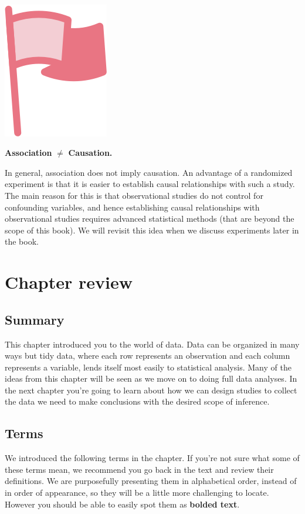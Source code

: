 \documentclass[
  10pt,
  openany]{book}
\newenvironment{mdframedwithfootImportant}
{   
    \savenotes
    \begin{mdframed}[%
    topline=true, bottomline=true, linecolor=oiR, linewidth=0.5pt,
    rightline=false, leftline=false,
    backgroundcolor=oiLGray]
    \renewcommand{\thempfootnote}{\arabic{footnote}}
    }
{
    \end{mdframed}
    \spewnotes
}
\newenvironment{important}{
    \let\oldtextbf\textbf
    \renewcommand{\textbf}[1]{{\textcolor{oiR}{\oldtextbf{##1}}}}
\vspace{4mm}
\begin{mdframedwithfootImportant}
\begin{minipage}[t]{0.10\textwidth}
{$\:$ \\ \setkeys{Gin}{width=2.5em,keepaspectratio}\includegraphics{images/_icons/important.png}}
\end{minipage}
\hfill
\begin{minipage}[t]{0.90\textwidth}
\vspace{-2mm}
\setlength{\parskip}{1em}
}{\end{minipage}
\end{mdframedwithfootImportant}
\vspace{4mm}
}
\begin{document}
\begin{important}
\textbf{Association} \(\neq\) \textbf{Causation.}

In general, association does not imply causation.
An advantage of a randomized experiment is that it is easier to establish causal relationships with such a study.
The main reason for this is that observational studies do not control for confounding variables, and hence establishing causal relationships with observational studies requires advanced statistical methods (that are beyond the scope of this book).
We will revisit this idea when we discuss experiments later in the book.

\end{important}

\vspace{10mm}

\hypertarget{chp1-review}{%
\section{Chapter review}\label{chp1-review}}

\hypertarget{summary}{%
\subsection{Summary}\label{summary}}

This chapter introduced you to the world of data.
Data can be organized in many ways but tidy data, where each row represents an observation and each column represents a variable, lends itself most easily to statistical analysis.
Many of the ideas from this chapter will be seen as we move on to doing full data analyses.
In the next chapter you're going to learn about how we can design studies to collect the data we need to make conclusions with the desired scope of inference.

\hypertarget{terms}{%
\subsection{Terms}\label{terms}}

We introduced the following terms in the chapter.
If you're not sure what some of these terms mean, we recommend you go back in the text and review their definitions.
We are purposefully presenting them in alphabetical order, instead of in order of appearance, so they will be a little more challenging to locate.
However you should be able to easily spot them as \textbf{bolded text}.
\end{document}
